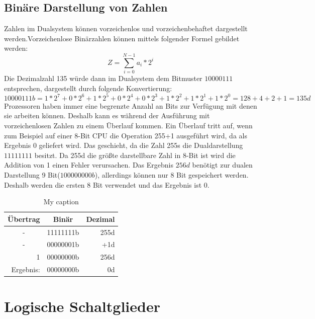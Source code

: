 \documentclass[12pt]{article}
\begin{document}
\subsection{Binäre Darstellung von Zahlen}
Zahlen im Dualsystem können vorzeichenlos und vorzeichenbehaftet dargestellt werden.Vorzeichenlose Binärzahlen können mittels folgender Formel gebildet werden: $$Z=\sum\limits_{i=0}^{N-1} a_i * 2^i$$ 
Die Dezimalzahl 135 würde dann im Dualsystem dem Bitmuster $10000111$ entsprechen, dargestellt durch folgende Konvertierung:
$$10000111b = 1*2^7+0*2^6+1*2^5+0*2^4+0*2^3+1*2^2+1*2^1+1*2^0 = 128 +4+2+1 = 135d$$
Prozessoren haben immer eine begrenzte Anzahl an Bits zur Verfügung mit denen sie arbeiten können. Deshalb kann es während der Ausführung mit vorzeichenlosen Zahlen zu einem Überlauf kommen. Ein Überlauf tritt auf, wenn zum Beispiel auf einer 8-Bit CPU die Operation 255+1 ausgeführt wird, da als Ergebnis 0 geliefert wird. 
Das geschieht, da die Zahl 255s die Dualdarstellung $11111111$ besitzt. Da 255d die größte darstellbare Zahl in 8-Bit ist wird die Addition von 1 einen Fehler verursachen. Das Ergebnis $256d$ benötigt zur dualen Darstellung 9 Bit($100000000b$), allerdings können nur 8 Bit gespeichert werden. Deshalb werden die ersten 8 Bit verwendet und das Ergebnis ist 0.


\begin{table}[]
\centering
\caption{My caption}
\label{my-label}
\begin{tabular}{|c|r|r|}
\hline
\textbf{Übertrag}               & \multicolumn{1}{c|}{\textbf{Binär}} & \multicolumn{1}{c|}{\textbf{Dezimal}} \\ \hline
-                               & 11111111b                            & 255d                                   \\ \hline
-                               & 00000001b                            & +1d                                     \\ \hline
\multicolumn{1}{|r|}{1}         & 00000000b                            & 256d                                   \\ \hline\hline
\multicolumn{1}{|r|}{Ergebnis:} & 00000000b                            & 0d                                     \\ \hline
\end{tabular}
\end{table}


\section{Logische Schaltglieder}
\end{document}
